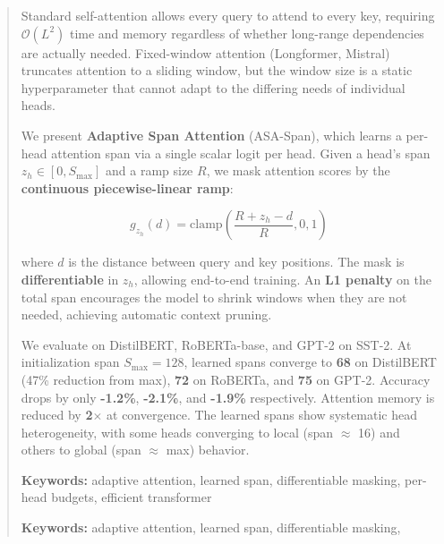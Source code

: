 \documentclass[10pt,twocolumn,letterpaper]{article}
\begin{document}
\maketitle

\begin{abstract}
Standard self-attention allows every query to attend to every key, requiring 
$\mathcal{O}(L^2)$ time and memory regardless of whether long-range dependencies 
are actually needed. Fixed-window attention (Longformer, Mistral) truncates 
attention to a sliding window, but the window size is a static hyperparameter 
that cannot adapt to the differing needs of individual heads.

We present \textbf{Adaptive Span Attention} (ASA-Span), which learns a per-head 
attention span via a single scalar logit per head. Given a head's span 
$z_h \in [0, S_\text{max}]$ and a ramp size $R$, we mask attention scores by 
the \textbf{continuous piecewise-linear ramp}:

\[
g_{z_h}(d) = \text{clamp}\!\left(\frac{R + z_h - d}{R}, 0, 1\right)
\]

where $d$ is the distance between query and key positions. The mask is 
\textbf{differentiable} in $z_h$, allowing end-to-end training. An \textbf{L1 penalty} 
on the total span encourages the model to shrink windows when they are not 
needed, achieving automatic context pruning.

We evaluate on DistilBERT, RoBERTa-base, and GPT-2 on SST-2. At initialization 
span $S_\text{max} = 128$, learned spans converge to 
\textbf{68} on DistilBERT (47\% reduction from max), 
\textbf{72} on RoBERTa, and \textbf{75} on GPT-2. Accuracy drops by 
only \textbf{-1.2\%}, \textbf{-2.1\%}, and \textbf{-1.9\%} respectively. 
Attention memory is reduced by \textbf{2$\times$} at convergence. The 
learned spans show systematic head heterogeneity, with some heads converging 
to local (span $\approx$ 16) and others to global (span $\approx$ max) behavior.

\textbf{Keywords:} adaptive attention, learned span, differentiable masking, 
per-head budgets, efficient transformer



\vspace{0.5em}
\noindent\textbf{Keywords:} adaptive attention, learned span, differentiable masking,
\end{abstract}

\vspace{1em}
\end{document}
